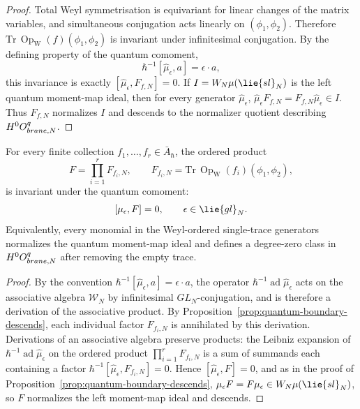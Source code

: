 \documentclass[11pt]{memoir}
\begin{document}
\begin{proof}
  Total Weyl symmetrisation is equivariant for linear changes of the matrix
  variables, and simultaneous conjugation acts linearly on
  $(\phi_1,\phi_2)$. Therefore
  $\mathrm{Tr}\,\operatorname{Op}_{\mathrm W}(f)(\phi_1,\phi_2)$ is invariant
  under infinitesimal conjugation. By the defining property of the quantum
  comoment,
  $$\hbar^{-1}[\widehat\mu_\epsilon,a]=\epsilon\cdot a,$$
  this invariance is exactly $[\widehat\mu_\epsilon,F_{f,N}]=0$. If
  $I=\mathcal W_N\widehat\mu(\lie{sl}_N)$ is the left quantum moment-map ideal,
  then for every generator $\widehat\mu_\epsilon$,
  $\widehat\mu_\epsilon F_{f,N}=F_{f,N}\widehat\mu_\epsilon\in I$. Thus
  $F_{f,N}$ normalizes $I$ and descends to the normalizer quotient describing
  $H^0O^{q}_{brane,N}$.
\end{proof}

\begin{prop}\label{prop:quantum-boundary-descends-products}
  For every finite collection $f_1,\ldots,f_r\in\bar A_\hbar$, the ordered
  product
  $$F=\prod_{i=1}^{r}F_{f_i,N},
    \qquad F_{f_i,N}=\mathrm{Tr}\,\operatorname{Op}_{\mathrm W}(f_i)(\phi_1,\phi_2),$$
  is invariant under the quantum comoment:
  $$[\widehat\mu_\epsilon,F]=0,\qquad \epsilon\in\lie{gl}_N.$$
  Equivalently, every monomial in the Weyl-ordered single-trace generators
  normalizes the quantum moment-map ideal and defines a degree-zero class in
  $H^0O^{q}_{brane,N}$ after removing the empty trace.
\end{prop}

\begin{proof}
  By the convention $\hbar^{-1}[\widehat\mu_\epsilon,a]=\epsilon\cdot a$, the
  operator $\hbar^{-1}\operatorname{ad}\widehat\mu_\epsilon$ acts on the
  associative algebra $\mathcal W_N$ by infinitesimal $GL_N$-conjugation, and
  is therefore a derivation of the associative product. By
  Proposition~\ref{prop:quantum-boundary-descends}, each individual factor
  $F_{f_i,N}$ is annihilated by this derivation. Derivations of an associative
  algebra preserve products: the Leibniz expansion of
  $\hbar^{-1}\operatorname{ad}\widehat\mu_\epsilon$ on the ordered product
  $\prod_{i=1}^{r}F_{f_i,N}$ is a sum of summands each containing a factor
  $\hbar^{-1}[\widehat\mu_\epsilon,F_{f_i,N}]=0$. Hence
  $[\widehat\mu_\epsilon,F]=0$, and as in the proof of
  Proposition~\ref{prop:quantum-boundary-descends},
  $\widehat\mu_\epsilon F=F\widehat\mu_\epsilon\in
   \mathcal W_N\widehat\mu(\lie{sl}_N)$, so $F$ normalizes the left moment-map
  ideal and descends.
\end{proof}
\end{document}
